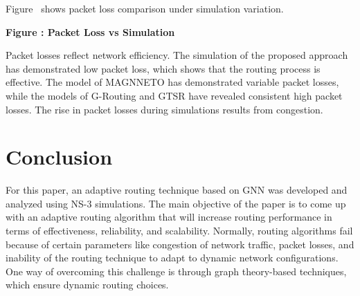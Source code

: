 \documentclass[a4paper,fleqn]{cas-dc}
\numberwithin{equation}{section}
\begin{document}
\noindent Figure \thefigure\ shows packet loss comparison under simulation variation.

\begin{center}

\textbf{Figure \thefigure: Packet Loss vs Simulation}
\end{center}
Packet losses reflect network efficiency. The simulation of the proposed approach has demonstrated low packet loss, which shows that the routing process is effective. The model of MAGNNETO has demonstrated variable packet losses, while the models of G-Routing and GTSR have revealed consistent high packet losses. The rise in packet losses during simulations results from congestion.

\section{Conclusion}


For this paper, an adaptive routing technique based on GNN was developed and analyzed using NS-3 simulations. The main objective of the paper is to come up with an adaptive routing algorithm that will increase routing performance in terms of effectiveness, reliability, and scalability. Normally, routing algorithms fail because of certain parameters like congestion of network traffic, packet losses, and inability of the routing technique to adapt to dynamic network configurations. One way of overcoming this challenge is through graph theory-based techniques, which ensure dynamic routing choices.
\end{document}
